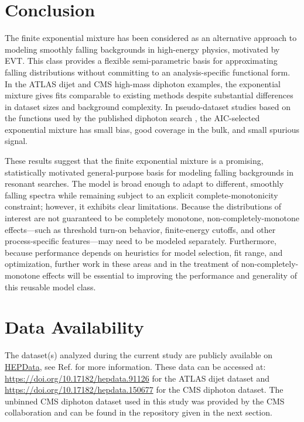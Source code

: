 \documentclass[a4paper,11pt]{article}
\begin{document}
\section{Conclusion} \label{sec:conclusion}

The finite exponential mixture has been considered as an alternative approach to modeling 
smoothly falling backgrounds in high-energy physics, motivated by EVT.
This class provides a flexible semi-parametric basis for approximating falling distributions 
without committing to an analysis-specific functional form. In the ATLAS dijet and CMS 
high-mass diphoton examples, the exponential mixture gives fits comparable to existing methods despite substantial differences in dataset sizes and background complexity.
In pseudo-dataset studies based on the functions used by the published diphoton search \cite{CMS_high_mass_diphoton}, the AIC-selected exponential mixture has small bias, good coverage in the bulk, and small spurious signal.

These results suggest that the finite exponential mixture is a promising, statistically motivated general-purpose basis for modeling falling backgrounds in resonant searches. The model is broad enough to adapt to different, smoothly falling spectra while remaining subject to an explicit complete-monotonicity constraint; however, it exhibits clear limitations. Because the distributions of interest are not guaranteed to be completely monotone, non-completely-monotone effects—such as threshold turn-on behavior, finite-energy cutoffs, and other process-specific features—may need to be modeled separately. Furthermore, because performance depends on heuristics for model selection, fit range, and optimization, further work in these areas and in the treatment of non-completely-monotone effects will be essential to improving the performance and generality of this reusable model class.

\section*{Data Availability}
The dataset(s) analyzed during the current study are publicly available on \href{https://www.hepdata.net/}{HEPData}, see Ref. \cite{Maguire_2017} for more information. These data can be accessed at: \url{https://doi.org/10.17182/hepdata.91126} for the ATLAS dijet dataset and \url{https://doi.org/10.17182/hepdata.150677} for the CMS diphoton dataset. The unbinned CMS diphoton dataset used in this study was provided by the CMS collaboration and can be found in the repository given in the next section.
\end{document}
